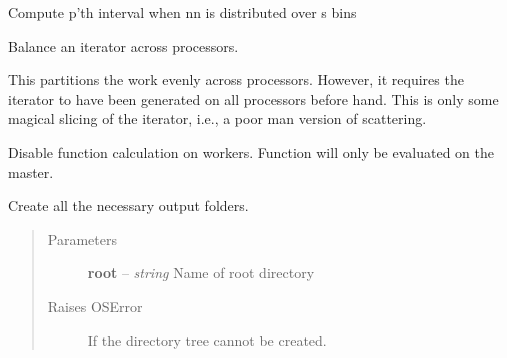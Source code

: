 \documentclass[letterpaper,10pt,english]{sphinxmanual}
\begin{document}

\begin{fulllineitems}
\label{docs/all_multipliers:all_multipliers.balance}
Compute p'th interval when nn is distributed over s bins

\end{fulllineitems}



\begin{fulllineitems}
\label{docs/all_multipliers:all_multipliers.balanced}
Balance an iterator across processors.

This partitions the work evenly across processors. However, it requires
the iterator to have been generated on all processors before hand. This is
only some magical slicing of the iterator, i.e., a poor man version of
scattering.

\end{fulllineitems}



\begin{fulllineitems}
\label{docs/all_multipliers:all_multipliers.disable_on_workers}
Disable function calculation on workers. Function will
only be evaluated on the master.

\end{fulllineitems}



\begin{fulllineitems}
\label{docs/all_multipliers:all_multipliers.do_output_directory_creation}
Create all the necessary output folders.
\begin{quote}\begin{description}
\item[{Parameters}] \leavevmode
\textbf{root} -- \emph{string} Name of root directory

\item[{Raises OSError}] \leavevmode
If the directory tree cannot be created.

\end{description}\end{quote}

\end{fulllineitems}
\end{document}
